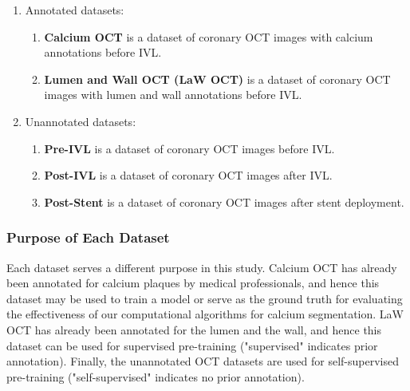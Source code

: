 \documentclass[a4paper,11pt,oneside]{report}
\begin{document}
\begin{enumerate}
    \item Annotated datasets:
    \begin{enumerate}
        \item \label{enum:calcium-dataset} \textbf{Calcium OCT} is a dataset of coronary OCT images with calcium annotations before IVL.
        \item \label{enum:lumen-and-wall-dataset} \textbf{Lumen and Wall OCT (LaW OCT)} is a dataset of coronary OCT images with lumen and wall annotations before IVL.
    \end{enumerate}
    \item \label{enum:unannotated-dataset} Unannotated datasets:
    \begin{enumerate}
        \item \textbf{Pre-IVL} is a dataset of coronary OCT images before IVL.
        \item \textbf{Post-IVL} is a dataset of coronary OCT images after IVL.
        \item \textbf{Post-Stent} is a dataset of coronary OCT images after stent deployment.
    \end{enumerate}
\end{enumerate}

\subsubsection{Purpose of Each Dataset}

Each dataset serves a different purpose in this study. Calcium OCT has already been annotated for calcium plaques by medical professionals, and hence this dataset may be used to train a model or serve as the ground truth for evaluating the effectiveness of our computational algorithms for calcium segmentation. LaW OCT has already been annotated for the lumen and the wall, and hence this dataset can be used for supervised pre-training ("supervised" indicates prior annotation). Finally, the unannotated OCT datasets are used for self-supervised pre-training ("self-supervised" indicates no prior annotation). 
\end{document}
